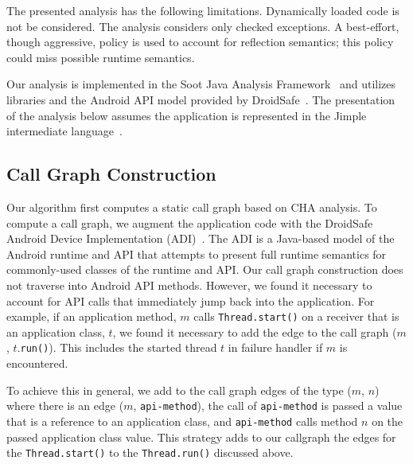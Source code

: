 The presented analysis has the following limitations. Dynamically
loaded code is not be considered.  The analysis considers only checked
exceptions.  A best-effort, though aggressive, policy is used to
account for reflection semantics; this policy could miss possible
runtime semantics.

Our analysis is implemented in the Soot Java Analysis
Framework~\cite{Vallee-Rai2000} and utilizes libraries and the Android
API model provided by
DroidSafe~\cite{Gordon:Kim:Perkins:Gilham:Nguyen:Rinard:NDSS15}. The
presentation of the analysis below assumes the application is
represented in the Jimple intermediate language~\cite{Vallee-Rai2000}.

\subsection{Call Graph Construction}


Our algorithm first computes a static call graph based on CHA
analysis. To compute a call graph, we augment the application code with the
DroidSafe Android Device Implementation
(ADI)~\cite{Gordon:Kim:Perkins:Gilham:Nguyen:Rinard:NDSS15}.  The ADI
is a Java-based model of the Android runtime and API that attempts to
present full runtime semantics for commonly-used classes of the
runtime and API.  Our call graph construction does not traverse into
Android API methods.  However, we found it necessary to account for
API calls that immediately jump back into the application.  For
example, if an application method, $m$ calls
\lstinline!Thread.start()! on a receiver that is an application class,
$t$, we found it necessary to add the edge to the call graph ($m$,
$t$.\lstinline!run()!).  This includes the started thread $t$ in
failure handler if $m$ is encountered.

To achieve this in general, we add to the call graph edges of the type
($m$, $n$) where there is an edge ($m$, \lstinline!api-method!), the
call of \lstinline!api-method! is passed a value that is a reference
to an application class, and \lstinline!api-method! calls method $n$
on the passed application class value.  This strategy adds to our
callgraph the edges for the \lstinline!Thread.start()! to the
\lstinline!Thread.run()! discussed above.

